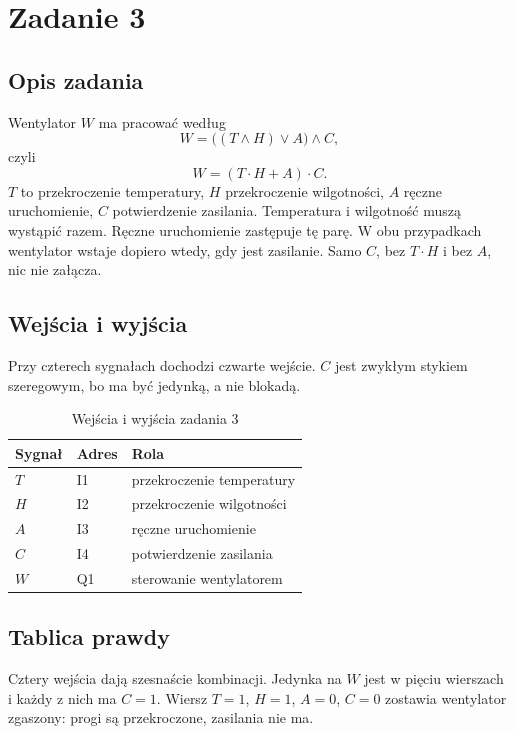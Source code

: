 \newpage
\section{Zadanie 3}

\subsection{Opis zadania}

Wentylator $W$ ma pracować według
\[
W = \bigl((T \wedge H) \vee A\bigr) \wedge C,
\]
czyli
\[
W = (T \cdot H + A) \cdot C.
\]
$T$ to przekroczenie temperatury, $H$ przekroczenie wilgotności, $A$ ręczne uruchomienie, $C$ potwierdzenie zasilania. Temperatura i wilgotność muszą wystąpić razem. Ręczne uruchomienie zastępuje tę parę. W obu przypadkach wentylator wstaje dopiero wtedy, gdy jest zasilanie. Samo $C$, bez $T \cdot H$ i bez $A$, nic nie załącza.

\subsection{Wejścia i wyjścia}

Przy czterech sygnałach dochodzi czwarte wejście. $C$ jest zwykłym stykiem szeregowym, bo ma być jedynką, a nie blokadą.

\begin{table}[H]
    \centering
    \caption{Wejścia i wyjścia zadania 3}
    \label{tab:z3-io}
    \begin{tabular}{|l|l|p{8.2cm}|}
        \hline
        \textbf{Sygnał} & \textbf{Adres} & \textbf{Rola} \\
        \hline
        $T$ & I1 & przekroczenie temperatury \\
        \hline
        $H$ & I2 & przekroczenie wilgotności \\
        \hline
        $A$ & I3 & ręczne uruchomienie \\
        \hline
        $C$ & I4 & potwierdzenie zasilania \\
        \hline
        $W$ & Q1 & sterowanie wentylatorem \\
        \hline
    \end{tabular}
\end{table}

\subsection{Tablica prawdy}

Cztery wejścia dają szesnaście kombinacji. Jedynka na $W$ jest w pięciu wierszach i każdy z nich ma $C = 1$. Wiersz $T = 1$, $H = 1$, $A = 0$, $C = 0$ zostawia wentylator zgaszony: progi są przekroczone, zasilania nie ma.

